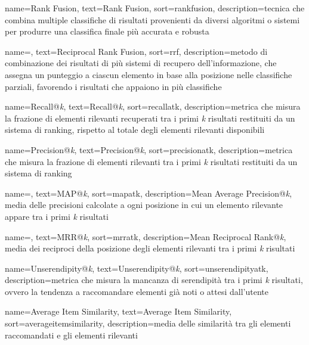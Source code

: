  {
    name=Rank Fusion,
    text=Rank Fusion,
    sort=rankfusion,
    description={tecnica che combina multiple classifiche di risultati provenienti da diversi algoritmi o sistemi per produrre una classifica finale più accurata e robusta}
}

 {
    name=,
    text=Reciprocal Rank Fusion,
    sort=rrf,
    description={metodo di combinazione dei risultati di più sistemi di recupero dell'informazione, che assegna un punteggio a ciascun elemento in base alla posizione nelle classifiche parziali, favorendo i risultati che appaiono in più classifiche}
}

 {
    name=Recall@\emph{k},
    text=Recall@\emph{k},
    sort=recallatk,
    description={metrica che misura la frazione di elementi rilevanti recuperati tra i primi \emph{k} risultati restituiti da un sistema di ranking, rispetto al totale degli elementi rilevanti disponibili}
}

 {
    name=Precision@\emph{k},
    text=Precision@\emph{k},
    sort=precisionatk,
    description={metrica che misura la frazione di elementi rilevanti tra i primi \emph{k} risultati restituiti da un sistema di ranking}
}

 {
    name=,
    text=MAP@\emph{k},
    sort=mapatk,
    description={Mean Average Precision@\emph{k}, media delle precisioni calcolate a ogni posizione in cui un elemento rilevante appare tra i primi \emph{k} risultati}
}

 {
    name=,
    text=MRR@\emph{k},
    sort=mrratk,
    description={Mean Reciprocal Rank@\emph{k}, media dei reciproci della posizione degli elementi rilevanti tra i primi \emph{k} risultati}
}

 {
    name=Unserendipity@\emph{k},
    text=Unserendipity@\emph{k},
    sort=unserendipityatk,
    description={metrica che misura la mancanza di serendipità tra i primi \emph{k} risultati, ovvero la tendenza a raccomandare elementi già noti o attesi dall'utente}
}

 {
    name=Average Item Similarity,
    text=Average Item Similarity,
    sort=averageitemsimilarity,
    description={media delle similarità tra gli elementi raccomandati e gli elementi rilevanti}
}

